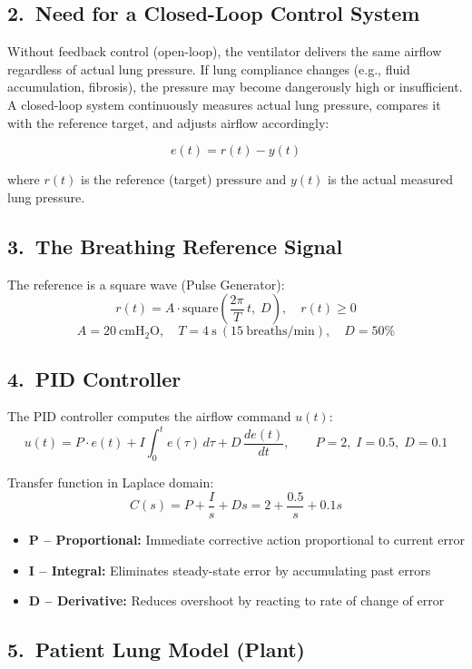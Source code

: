 \documentclass[12pt,a4paper]{article}
\begin{document}
\subsection*{2.\ Need for a Closed-Loop Control System}

Without feedback control (open-loop), the ventilator delivers the same airflow regardless of actual lung pressure. If lung compliance changes (e.g., fluid accumulation, fibrosis), the pressure may become dangerously high or insufficient. A closed-loop system continuously measures actual lung pressure, compares it with the reference target, and adjusts airflow accordingly:

\[
e(t) = r(t) - y(t)
\]

where $r(t)$ is the reference (target) pressure and $y(t)$ is the actual measured lung pressure.

\subsection*{3.\ The Breathing Reference Signal}

The reference is a square wave (Pulse Generator):
\[
r(t) = A \cdot \mathrm{square}\!\left(\frac{2\pi}{T}\,t,\;D\right),\quad r(t)\geq 0
\]
\[
A = 20\ \mathrm{cmH_2O},\quad T = 4\ \mathrm{s\ (15\ breaths/min)},\quad D = 50\%
\]

\subsection*{4.\ PID Controller}

The PID controller computes the airflow command $u(t)$:
\[
u(t) = P\cdot e(t) + I\int_0^t e(\tau)\,d\tau + D\,\frac{de(t)}{dt}, \qquad P=2,\;I=0.5,\;D=0.1
\]

Transfer function in Laplace domain:
\[
C(s) = P + \frac{I}{s} + Ds = 2 + \frac{0.5}{s} + 0.1s
\]

\begin{itemize}
  \item \textbf{P -- Proportional:} Immediate corrective action proportional to current error
  \item \textbf{I -- Integral:} Eliminates steady-state error by accumulating past errors
  \item \textbf{D -- Derivative:} Reduces overshoot by reacting to rate of change of error
\end{itemize}

\subsection*{5.\ Patient Lung Model (Plant)}
\end{document}

